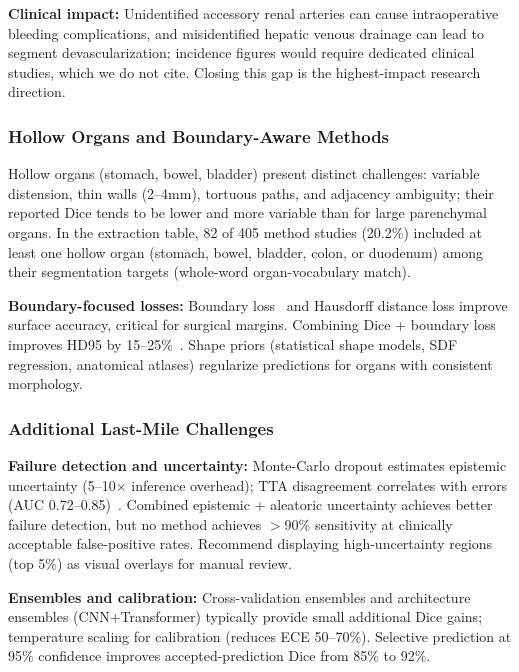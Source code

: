 \textbf{Clinical impact:} Unidentified accessory renal arteries can cause intraoperative bleeding complications, and misidentified hepatic venous drainage can lead to segment devascularization; incidence figures would require dedicated clinical studies, which we do not cite. Closing this gap is the highest-impact research direction.

\subsubsection{Hollow Organs and Boundary-Aware Methods}

Hollow organs (stomach, bowel, bladder) present distinct challenges: variable distension, thin walls (2--4mm), tortuous paths, and adjacency ambiguity; their reported Dice tends to be lower and more variable than for large parenchymal organs. In the extraction table, 82 of 405 method studies (20.2\%) included at least one hollow organ (stomach, bowel, bladder, colon, or duodenum) among their segmentation targets (whole-word organ-vocabulary match).

\textbf{Boundary-focused losses:} Boundary loss~\cite{kervadec2019boundary} and Hausdorff distance loss improve surface accuracy, critical for surgical margins. Combining Dice + boundary loss improves HD95 by 15--25\%~\cite{kervadec2019boundary}. Shape priors (statistical shape models, SDF regression, anatomical atlases) regularize predictions for organs with consistent morphology.

\subsubsection{Additional Last-Mile Challenges}

\textbf{Failure detection and uncertainty:} Monte-Carlo dropout estimates epistemic uncertainty (5--10$\times$ inference overhead); TTA disagreement correlates with errors (AUC 0.72--0.85)~\cite{wang2019uncertainty}. Combined epistemic + aleatoric uncertainty achieves better failure detection, but no method achieves $>$90\% sensitivity at clinically acceptable false-positive rates. Recommend displaying high-uncertainty regions (top 5\%) as visual overlays for manual review.

\textbf{Ensembles and calibration:} Cross-validation ensembles and architecture ensembles (CNN+Transformer) typically provide small additional Dice gains; temperature scaling for calibration (reduces ECE 50--70\%). Selective prediction at 95\% confidence improves accepted-prediction Dice from 85\% to 92\%.

